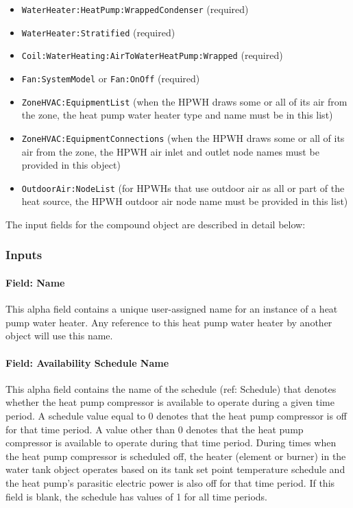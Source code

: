\begin{itemize}
\item
  \lstinline!WaterHeater:HeatPump:WrappedCondenser! (required)
\item
  \lstinline!WaterHeater:Stratified! (required)
\item
  \lstinline!Coil:WaterHeating:AirToWaterHeatPump:Wrapped! (required)
\item
  \lstinline!Fan:SystemModel! or \lstinline!Fan:OnOff! (required)
\item
  \lstinline!ZoneHVAC:EquipmentList! (when the HPWH draws some or all of its air from the zone, the heat pump water heater type and name must be in this list)
\item
  \lstinline!ZoneHVAC:EquipmentConnections! (when the HPWH draws some or all of its air from the zone, the HPWH air inlet and outlet node names must be provided in this object)
\item
  \lstinline!OutdoorAir:NodeList! (for HPWHs that use outdoor air as all or part of the heat source, the HPWH outdoor air node name must be provided in this list)
\end{itemize}

The input fields for the compound object are described in detail below:

\subsubsection{Inputs}\label{inputs-4-037}

\paragraph{Field: Name}\label{field-name-3-036}

This alpha field contains a unique user-assigned name for an instance of a heat pump water heater. Any reference to this heat pump water heater by another object will use this name.

\paragraph{Field: Availability Schedule Name}\label{field-availability-schedule-name-1-014}

This alpha field contains the name of the schedule (ref: Schedule) that denotes whether the heat pump compressor is available to operate during a given time period. A schedule value equal to 0 denotes that the heat pump compressor is off for that time period. A value other than 0 denotes that the heat pump compressor is available to operate during that time period. During times when the heat pump compressor is scheduled off, the heater (element or burner) in the water tank object operates based on its tank set point temperature schedule and the heat pump's parasitic electric power is also off for that time period. If this field is blank, the schedule has values of 1 for all time periods.

